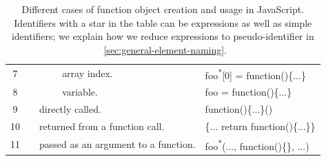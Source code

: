 \documentclass[10pt, preprint]{sigplanconf}
\begin{document}
\begin{table}
{\begin{tabular}{ | c | l | l | l | m{2.5cm} | l|}
   7 &
   &
   & \multicolumn{2}{|l|}{
      array index.}
   & foo\textsuperscript{*}[0] = function()\{...\} \\
   \cline{0-0}\cline{4-6} 

   8 &
   & 
   & \multicolumn{2}{|l|}{
      variable.}
   & foo = function()\{...\} \\
   \cline{0-0}\cline{3-6} 
   
   9 &
   & \multicolumn{3}{|m{3.8cm}|}{
     \raggedright directly called.}
   & function()\{...\}() \\
   \cline{0-0}\cline{3-6} 

   10 &
   & \multicolumn{3}{|m{3.5cm}|}{
     \raggedright returned from a function call.}
   & \{... return function()\{...\}\} \\
   \cline{0-0}\cline{3-6} 

   11 &
   & \multicolumn{3}{|m{3.5cm}|}{
     \raggedright passed as an argument to a function.}
   & foo\textsuperscript{*}(..., function()\{\}, ...) \\
   \hline 

  \end{tabular}
    }
\caption{Different cases of function object creation and usage in JavaScript.  Identifiers with a star in the table can be expressions as well as simple identifiers; we explain how we reduce expressions to pseudo-identifier in ~\ref{sec:general-element-naming}.}
\label{table:function-types} 
\end{table}
\end{document}
